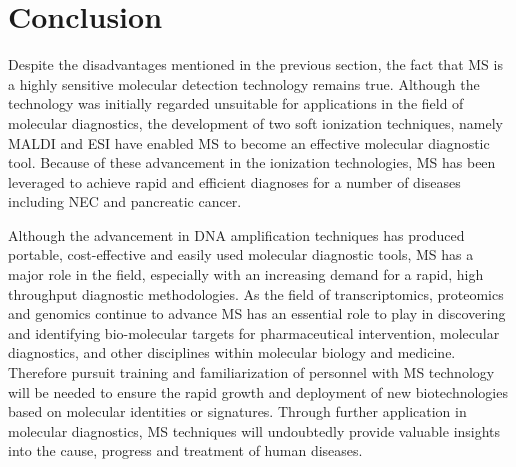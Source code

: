 \documentclass[letterpaper, 10 pt, conference]{ieeeconf}  %
\begin{document}
    \section{\textbf{Conclusion}}

Despite the disadvantages mentioned in the previous section, the fact that MS is a highly sensitive molecular detection technology remains true. Although the technology was initially regarded unsuitable for applications in the field of molecular diagnostics, the development of two soft ionization techniques, namely MALDI and ESI have enabled MS to become an effective molecular diagnostic tool. Because of these advancement in the ionization technologies, MS has been leveraged to achieve rapid and efficient diagnoses for a number of diseases including NEC and pancreatic cancer. 

Although the advancement in DNA amplification techniques has produced portable, cost-effective and easily used molecular diagnostic tools, MS has a major role in the field, especially with an increasing demand for a rapid, high throughput diagnostic methodologies. As the field of transcriptomics, proteomics and genomics continue to advance MS has an essential role to play in discovering and identifying bio-molecular targets for pharmaceutical intervention, molecular diagnostics, and other disciplines within molecular biology and medicine. Therefore pursuit training and familiarization of personnel with MS technology will be needed to ensure the rapid growth and deployment of new biotechnologies based on molecular identities or signatures. Through further application in molecular diagnostics, MS techniques will undoubtedly provide valuable insights into the cause, progress and treatment of human diseases.

\end{document}
